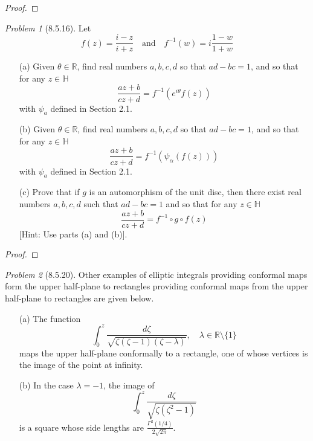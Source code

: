 \documentclass[10pt]{article}
\newcommand{\sk}{\vskip 6mm}
\newcommand{\bb}[1]{\mathbb{#1}}
\theoremstyle{remark}
\newtheorem{problem}{Problem}
\theoremstyle{remark}
\begin{document}
\begin{proof}
  
\end{proof}

\sk

\begin{problem}[8.5.16]
  Let
  \[
    f(z)=\frac{i-z}{i+z}\quad\text{and}\quad f^{-1}(w)=i\frac{1-w}{1+w}
  \]
  \begin{enumerate}
  \item[(a)] Given $\theta\in\bb{R}$, find real numbers $a,b,c,d$ so that $ad-bc=1$, and so that for any $z\in\bb{H}$
    \[
      \frac{az+b}{cz+d}=f^{-1}(e^{i\theta}f(z))
    \]
    with $\psi_a$ defined in Section 2.1.
  \item[(b)] Given $\theta\in\bb{R}$, find real numbers $a,b,c,d$ so that $ad-bc=1$, and so that for any $z\in\bb{H}$
    \[
      \frac{az+b}{cz+d}=f^{-1}(\psi_\alpha(f(z)))
    \]
    with $\psi_a$ defined in Section 2.1.
  \item[(c)] Prove that if $g$ is an automorphism of the unit disc, then there exist real numbers $a,b,c,d$ such that $ad-bc=1$ and so that for any $z\in\bb{H}$
    \[
      \frac{az+b}{cz+d}=f^{-1}\circ g\circ f(z)
    \]
    [Hint: Use parts (a) and (b)].
  \end{enumerate}
\end{problem}

\begin{proof}
  
\end{proof}

\sk

\begin{problem}[8.5.20]
  Other examples of elliptic integrals providing conformal maps form the upper half-plane to rectangles providing conformal maps from the upper half-plane to rectangles are given below.
  \begin{enumerate}
  \item[(a)] The function
    \[
      \int_0^z\frac{d\zeta}{\sqrt{\zeta(\zeta-1)(\zeta-\lambda)}},\quad \lambda\in\bb{R}\setminus\{1\}
    \]
    maps the upper half-plane conformally to a rectangle, one of whose vertices is the image of the point at infinity.
  \item[(b)] In the case $\lambda=-1$, the image of
    \[
      \int_0^z\frac{d\zeta}{\sqrt{\zeta(\zeta^2-1)}}
    \]
    is a square whose side lengths are $\frac{\Gamma^2(1/4)}{2\sqrt{2\pi}}$.
  \end{enumerate}
\end{problem}
\end{document}
